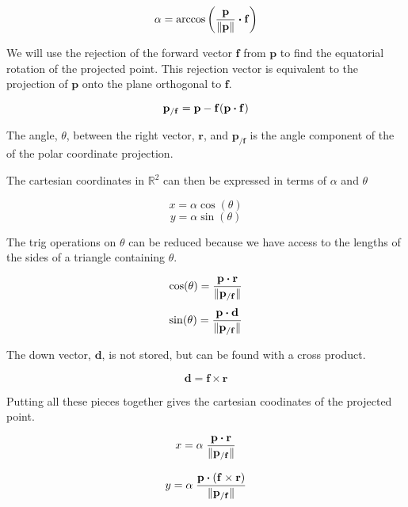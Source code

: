 \documentclass[twoside,12pt]{article}
\begin{document}
\[
\alpha = \arccos \left( \frac{\mathbf{p}}{\|\mathbf{p}\|}  \boldsymbol{\cdot} \mathbf{f} \right)
\]

We will use the rejection of the forward vector $\mathbf{f}$ from $\mathbf{p}$ to find the equatorial rotation of the projected point. This rejection vector is equivalent to the projection of $\mathbf{p}$ onto the plane orthogonal to $\mathbf{f}$.

\[
\mathbf{p}_{/\mathbf{f}} = \mathbf{p} - \mathbf{f} ( \mathbf{p} \boldsymbol{\cdot} \mathbf{f} )
\]

The angle, $\theta$, between the right vector, $\mathbf{r}$, and $\mathbf{p}_{/\mathbf{f}}$ is the angle component of the of the polar coordinate projection.


The cartesian coordinates in $\mathbb{R}^2$ can then be expressed in terms of $\alpha$ and $\theta$

\[ x = \alpha \cos ( \theta ) \]
\[ y = \alpha \sin ( \theta ) \]

The trig operations on $\theta$ can be reduced because we have access to the lengths of the sides of a triangle containing $\theta$.

\[ \cos ( \theta ) = \frac{ \mathbf{p} \boldsymbol{\cdot} \mathbf{r} }{ \| \mathbf{p}_{/\mathbf{f}} \| } \]
\[ \sin ( \theta ) = \frac{ \mathbf{p} \boldsymbol{\cdot} \mathbf{d} }{ \| \mathbf{p}_{/\mathbf{f}} \| } \]

The down vector, $\mathbf{d}$, is not stored, but can be found with a cross product.

\[ \mathbf{d} = \mathbf{f} \times \mathbf{r} \]

Putting all these pieces together gives the cartesian coodinates of the projected point.

\[ x = \alpha \; \frac{ \mathbf{p} \boldsymbol{\cdot} \mathbf{r} }{ \| \mathbf{p}_{/\mathbf{f}} \| } \]

\[ y = \alpha \; \frac{ \mathbf{p} \boldsymbol{\cdot} ( \mathbf{f} \times \mathbf{r} ) }{ \| \mathbf{p}_{/\mathbf{f}} \| } \]
\end{document}
